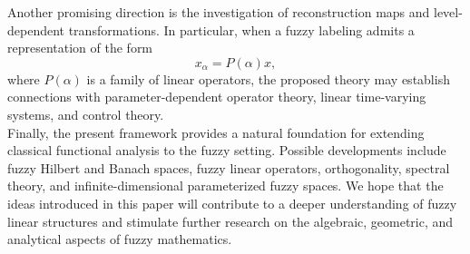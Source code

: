 \documentclass[preprint,12pt]{elsarticle}
\theoremstyle{definition}
\begin{document}
Another promising direction is the investigation of reconstruction maps and level-dependent transformations. In particular, when a fuzzy labeling admits a representation of the form \[ x_\alpha=P(\alpha)x, \] where $P(\alpha)$ is a family of linear operators, the proposed theory may establish connections with parameter-dependent operator theory, linear time-varying systems, and control theory.\\
Finally, the present framework provides a natural foundation for extending classical functional analysis to the fuzzy setting. Possible developments include fuzzy Hilbert and Banach spaces, fuzzy linear operators, orthogonality, spectral theory, and infinite-dimensional parameterized fuzzy spaces. We hope that the ideas introduced in this paper will contribute to a deeper understanding of fuzzy linear structures and stimulate further research on the algebraic, geometric, and analytical aspects of fuzzy mathematics.





\end{document}

